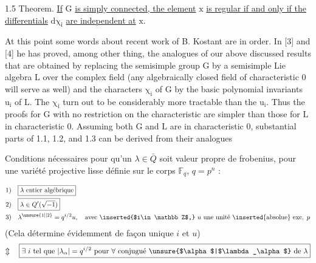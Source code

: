 1.5 Theorem. \uline{If} $\mathrm{G}$ \uline{is simply connected, the element} $\mathrm{x}$ \uline{is regular
if and only if the differentials} $\mathrm{d\chi_i}$ \uline{are independent at} $\mathrm{x}$.

At this point some words about recent work of B. Kostant are in order.
In [3] and [4] he has proved, among other thing, the analogues of our above
discussed results that are obtained by replacing the semisimple group $\mathrm{G}$ by
a semisimple Lie algebra $\mathrm{L}$ over the complex field (any algebraically
closed field of characteristic $\mathrm{0}$ will serve as well) and the characters
$\mathrm{\chi_i}$ of $\mathrm{G}$ by the basic polynomial invariants $\mathrm{u_i}$ of $\mathrm{L}$. The $\mathrm{\chi_i}$ turn
out to be considerably more tractable than the $\mathrm{u_i}$. Thus the proofs for $\mathrm{G}$
with no restriction on the characteristic are simpler than those for $\mathrm{L}$ in
characteristic $\mathrm{0}$. Assuming both $\mathrm{G}$ and $\mathrm{L}$ are in characteristic $\mathrm{0}$,
substantial parts of 1.1, 1.2, and 1.3 can be derived from their analogues

Conditions nécessaires pour qu'un $\lambda\in\bar Q$ soit valeur
propre de  frobenius, pour une variété projective
lisse définie sur le corps $\mathbb F_q$, $q=p^n$ :


\[
\begin{aligned}
1)&\quad\boxed{\lambda\ \text{entier algébrique}}\\
2)&\quad\boxed{\lambda\in Q'(\sqrt{-1})}\\
3)&\quad\lambda^{\unsure{1|{}|2}}=q^{i/2}u,\quad\text{avec \inserted{$i\in\mathbb Z$,} $u$ une unité \inserted{absolue} exc. $p$}
\end{aligned}
\]
(Cela détermine évidemment de façon unique $i$ et $u$)
\[
\Updownarrow\quad \boxed{\exists\ i\ \text{tel que }|\lambda_\alpha|=q^{i/2}\text{ pour }\forall\text{ conjugué \unsure{$\alpha$|$\lambda_\alpha$} de }\lambda}
\]

